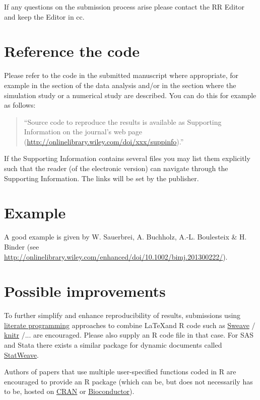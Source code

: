 \documentclass[12pt,a4paper]{article}
\begin{document}
If any questions on the submission process arise please contact the RR Editor
and keep the Editor in cc.


\section{Reference the code}

Please refer to the code in the submitted manuscript where appropriate, for
example in the section of the data analysis and/or in the section where the
simulation study or a numerical study are described. You can do this for example
as follows:
\begin{quote}
  ``Source code to reproduce the results is available as Supporting Information
  on the journal's web page (\url{http://onlinelibrary.wiley.com/doi/xxx/suppinfo}).''
\end{quote}

If the Supporting Information contains several files you may list them
explicitly such that the reader (of the electronic version) can navigate through
the Supporting Information. The links will be set by the publisher.

\section{Example}

A good example is given by W. Sauerbrei, A. Buchholz, A.-L. Boulesteix \& H.
Binder (see \url{http://onlinelibrary.wiley.com/enhanced/doi/10.1002/bimj.201300222/}).


\section{Possible improvements}

To further simplify and enhance reproducibility of results, submissions using
\href{http://en.wikipedia.org/wiki/Literate_Programming}{literate programming}
approaches to combine \LaTeX and \textsf{R} code such as
\href{http://en.wikipedia.org/wiki/Sweave}{Sweave}
\citep{Leisch:2002,Leisch:2003}/
\href{http://en.wikipedia.org/wiki/Knitr}{knitr} \citep{Xie:2013,Xie:2014}/...
are encouraged. Please also supply an \textsf{R} code file in that case. For
\textsf{SAS} and \textsf{Stata} there exists a similar package for dynamic
documents called
\href{http://homepage.stat.uiowa.edu/~rlenth/StatWeave/}{StatWeave}.

Authors of papers that use multiple user-specified functions coded in \textsf{R}
are encouraged to provide an \textsf{R} package (which can be, but does not
necessarily has to be, hosted on \href{http://cran.r-project.org/}{CRAN} or
\href{http://bioconductor.org/}{Bioconductor}).




\end{document}
